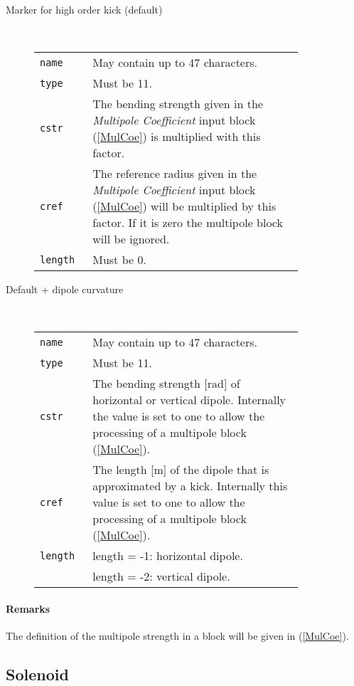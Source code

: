 \begin{description}
    \item [Marker for high order kick (default)]~

    \bigskip
    \begin{tabular}{@{}lp{0.8\linewidth}}
        \texttt{name} & May contain up to 47 characters. \\
        \texttt{type} & Must be 11. \\
        \texttt{cstr} & The bending strength given in the \textit{Multipole Coefficient} input block (\ref{MulCoe}) is multiplied with this factor.\\
        \texttt{cref} & The reference radius given in the \textit{Multipole Coefficient} input block (\ref{MulCoe}) will be multiplied by this factor. If it is zero the multipole block will be ignored.\\
        \texttt{length} & Must be 0.
    \end{tabular}
    \item [Default + dipole curvature]~

    \bigskip
    \begin{tabular}{@{}lp{0.8\linewidth}}
        \texttt{name} & May contain up to 47 characters. \\
        \texttt{type} & Must be 11. \\
        \texttt{cstr} & The bending strength [rad] of horizontal or vertical dipole. Internally the value is set to one to allow the processing of a multipole block (\ref{MulCoe}).\\
        \texttt{cref} & The length [m] of the dipole that is approximated by a kick. Internally this value is set to one to allow the processing of a multipole block (\ref{MulCoe}). \\
        \texttt{length} & length = -1: horizontal dipole. \\
                        & length = -2: vertical dipole.
    \end{tabular}
\end{description}

\paragraph{Remarks}
The definition of the multipole strength in a block will be given in (\ref{MulCoe}).

\subsection{Solenoid} \label{Solenoid}

